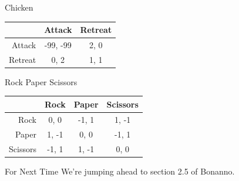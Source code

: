 \documentclass[
  14pt,
  letterpaper,
  ignorenonframetext,
  aspectratio=169,
]{beamer}
\begin{document}
\begin{frame}[fragile]{Chicken}
\protect\hypertarget{chicken}{}
\begin{table}[!h]
\centering
\begin{tabular}[t]{>{}r|cc}
\toprule
 & Attack & Retreat\\
\midrule
Attack & -99, -99 & 2, 0\\
Retreat & 0, 2 & 1, 1\\
\bottomrule
\end{tabular}
\end{table}
\end{frame}

\begin{frame}[fragile]{Rock Paper Scissors}
\protect\hypertarget{rock-paper-scissors}{}
\begin{table}[!h]
\centering
\begin{tabular}[t]{>{}r|ccc}
\toprule
 & Rock & Paper & Scissors\\
\midrule
Rock & 0, 0 & -1, 1 & 1, -1\\
Paper & 1, -1 & 0, 0 & -1, 1\\
Scissors & -1, 1 & 1, -1 & 0, 0\\
\bottomrule
\end{tabular}
\end{table}
\end{frame}

\begin{frame}{For Next Time}
\protect\hypertarget{for-next-time}{}
We're jumping ahead to section 2.5 of Bonanno.
\end{frame}
\end{document}
